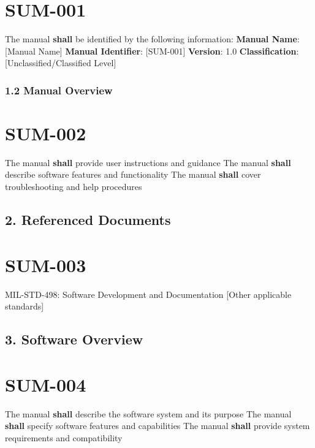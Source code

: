 \section{SUM-001}\label{SUM-001}

The manual \textbf{shall} be identified by the following information:
\textbf{Manual Name}: [Manual Name]
\textbf{Manual Identifier}: [SUM-001]
\textbf{Version}: 1.0
\textbf{Classification}: [Unclassified/Classified Level]

\subsubsection{1.2 Manual Overview}

\section{SUM-002}\label{SUM-002}

The manual \textbf{shall} provide user instructions and guidance
The manual \textbf{shall} describe software features and functionality
The manual \textbf{shall} cover troubleshooting and help procedures

\subsection{2. Referenced Documents}

\section{SUM-003}\label{SUM-003}

MIL-STD-498: Software Development and Documentation
[Other applicable standards]\\

\subsection{3. Software Overview}

\section{SUM-004}\label{SUM-004}

The manual \textbf{shall} describe the software system and its purpose
The manual \textbf{shall} specify software features and capabilities
The manual \textbf{shall} provide system requirements and compatibility

